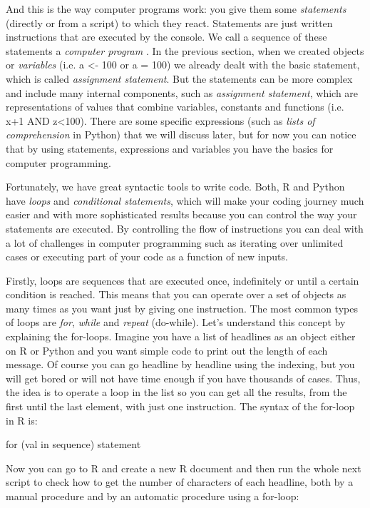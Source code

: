 And this is the way computer programs work: you give them some \emph{statements} (directly or from a script) to which they react. Statements are just written instructions that are executed by the console.  We call a sequence of these statements a \emph{computer program} . In the previous section, when we created objects or \emph{variables} (i.e. a \textless- 100 or a = 100) we already dealt with the basic statement, which is called \emph{assignment statement}. But the statements can be more complex and include many internal components, such as \emph{assignment statement}, which are representations of values that combine variables, constants and functions (i.e.  x+1 AND z\textless100). There are some specific expressions (such as \emph{lists of comprehension} in Python) that we will discuss later, but for now you can notice that by using statements, expressions and variables you have the basics for computer programming.

Fortunately, we have great syntactic tools to write code. Both, R and Python have \emph{loops} and \emph{conditional statements}, which will make your coding journey much easier and with more sophisticated results because you can control the way your statements are executed. By controlling the flow of instructions you can deal with a lot of challenges in computer programming such as iterating over unlimited cases or executing part of your code as a function of new inputs. 

Firstly, loops are sequences that are executed once, indefinitely or until a certain condition is reached. This means that you can operate over a set of objects as many times as you want just by giving one instruction. The most common types of loops are \emph{for}, \emph{while} and \emph{repeat} (do-while). Let’s understand this concept by explaining the for-loops. Imagine you have a list of headlines as an object either on R or Python and you want simple code to print out the length of each message. Of course you can go headline by headline using the indexing, but you will get bored or will not have time enough if you have thousands of cases. Thus, the idea is to operate a loop in the list so you can get all the results, from the first until the last element, with just one instruction.  The syntax of the for-loop in R is:

\begin{exampler}
for (val in sequence)
{
statement
}
\end{exampler}

Now you can go to R and create a new R document and then run the whole next script to check how to get the number of characters of each headline, both by a manual procedure and by an automatic procedure using a for-loop:

